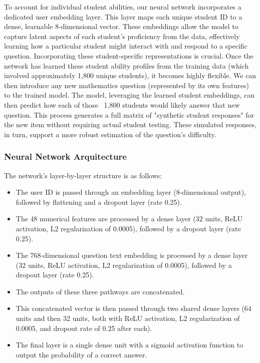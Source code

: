 \documentclass[
    a4paper, %
    10pt, %
    twoside, %
]{LTJournalArticle}
\begin{document}
To account for individual student abilities, our neural network incorporates a dedicated user embedding layer. This layer maps each unique student ID to a dense, learnable 8-dimensional vector. These embeddings allow the model to capture latent aspects of each student's proficiency from the data, effectively learning how a particular student might interact with and respond to a specific question. Incorporating these student-specific representations is crucial. Once the network has learned these student ability profiles from the training data (which involved approximately 1,800 unique students), it becomes highly flexible. We can then introduce any new mathematics question (represented by its own features) to the trained model. The model, leveraging the learned student embeddings, can then predict how each of those ~1,800 students would likely answer that new question. This process generates a full matrix of "synthetic student responses" for the new item without requiring actual student testing. These simulated responses, in turn, support a more robust estimation of the question's difficulty.

\subsubsection{Neural Network Arquitecture}

The network's layer-by-layer structure is as follows:

\begin{itemize}
    \item The user ID is passed through an embedding layer (8-dimensional output), followed by flattening and a dropout layer (rate 0.25).
    \item The 48 numerical features are processed by a dense layer (32 units, ReLU activation, L2 regularization of 0.0005), followed by a dropout layer (rate 0.25).
    \item The 768-dimensional question text embedding is processed by a dense layer (32 units, ReLU activation, L2 regularization of 0.0005), followed by a dropout layer (rate 0.25).
    \item The outputs of these three pathways are concatenated.
    \item This concatenated vector is then passed through two shared dense layers (64 units and then 32 units, both with ReLU activation, L2 regularization of 0.0005, and dropout rate of 0.25 after each).
    \item The final layer is a single dense unit with a sigmoid activation function to output the probability of a correct answer.
\end{itemize}
\end{document}
